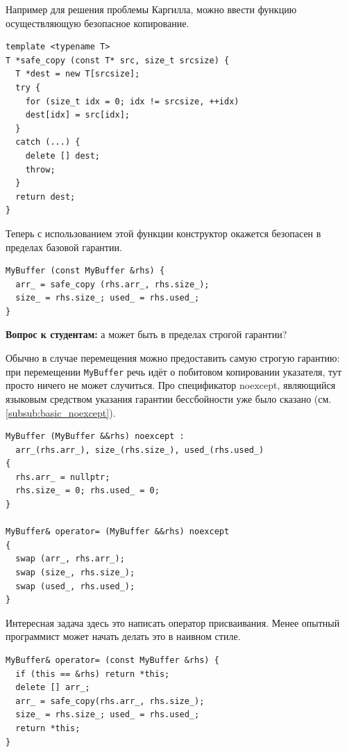 \documentclass[a4paper,12pt,oneside]{book}
\newif\ifanswers
\begin{document}
Например для решения проблемы Каргилла, можно ввести функцию осуществляющую безопасное копирование.

\begin{lstlisting}
template <typename T>
T *safe_copy (const T* src, size_t srcsize) {
  T *dest = new T[srcsize];
  try {
    for (size_t idx = 0; idx != srcsize, ++idx)
    dest[idx] = src[idx];
  }
  catch (...) {
    delete [] dest;
    throw;
  }
  return dest;
}
\end{lstlisting}

Теперь с использованием этой функции конструктор окажется безопасен в пределах базовой гарантии.

\begin{lstlisting}
MyBuffer (const MyBuffer &rhs) {
  arr_ = safe_copy (rhs.arr_, rhs.size_);
  size_ = rhs.size_; used_ = rhs.used_;
}
\end{lstlisting}

\textbf{Вопрос к студентам:} а может быть в пределах строгой гарантии?

\ifanswers
Правильный ответ: тут нет места транзакционности. Объект будет создан в согласованном но бесполезном состоянии.
\fi

Обычно в случае перемещения можно предоставить самую строгую гарантию: при перемещении \lstinline!MyBuffer! речь идёт о побитовом копировании указателя, тут просто ничего не может случиться. Про спецификатор noexcept, являющийся языковым средством указания гарантии бессбойности уже было сказано (см. \ref{subsub:basic_noexcept}).

\begin{lstlisting}
MyBuffer (MyBuffer &&rhs) noexcept : 
  arr_(rhs.arr_), size_(rhs.size_), used_(rhs.used_) 
{
  rhs.arr_ = nullptr;
  rhs.size_ = 0; rhs.used_ = 0;
}

MyBuffer& operator= (MyBuffer &&rhs) noexcept 
{
  swap (arr_, rhs.arr_); 
  swap (size_, rhs.size_); 
  swap (used_, rhs.used_);
}
\end{lstlisting}

Интересная задача здесь это написать оператор присваивания. Менее опытный программист может начать делать это в наивном стиле.

\begin{lstlisting}
MyBuffer& operator= (const MyBuffer &rhs) {
  if (this == &rhs) return *this;
  delete [] arr_;
  arr_ = safe_copy(rhs.arr_, rhs.size_);
  size_ = rhs.size_; used_ = rhs.used_;
  return *this;
}
\end{lstlisting}
\end{document}
